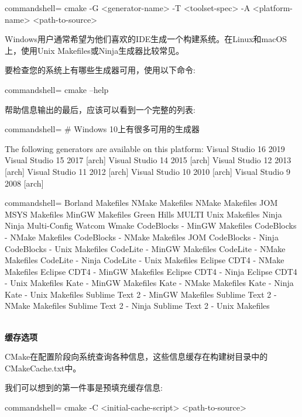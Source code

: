 \begin{tcblisting}{commandshell={}}
cmake -G <generator-name>
      -T <toolset-spec> -A <platform-name>
      <path-to-source>
\end{tcblisting}

Windows用户通常希望为他们喜欢的IDE生成一个构建系统。在Linux和macOS上，使用Unix Makefiles或Ninja生成器比较常见。

要检查您的系统上有哪些生成器可用，使用以下命令:

\begin{tcblisting}{commandshell={}}
cmake --help
\end{tcblisting}

帮助信息输出的最后，应该可以看到一个完整的列表:

\begin{tcblisting}{commandshell={}}
# Windows 10上有很多可用的生成器

The following generators are available on this platform:
Visual Studio 16 2019
Visual Studio 15 2017 [arch]
Visual Studio 14 2015 [arch]
Visual Studio 12 2013 [arch]
Visual Studio 11 2012 [arch]
Visual Studio 10 2010 [arch]
Visual Studio 9 2008 [arch]
\end{tcblisting}
\begin{tcblisting}{commandshell={}}
Borland Makefiles
NMake Makefiles
NMake Makefiles JOM
MSYS Makefiles
MinGW Makefiles
Green Hills MULTI
Unix Makefiles
Ninja
Ninja Multi-Config
Watcom Wmake
CodeBlocks - MinGW Makefiles
CodeBlocks - NMake Makefiles
CodeBlocks - NMake Makefiles JOM
CodeBlocks - Ninja
CodeBlocks - Unix Makefiles
CodeLite - MinGW Makefiles
CodeLite - NMake Makefiles
CodeLite - Ninja
CodeLite - Unix Makefiles
Eclipse CDT4 - NMake Makefiles
Eclipse CDT4 - MinGW Makefiles
Eclipse CDT4 - Ninja
Eclipse CDT4 - Unix Makefiles
Kate - MinGW Makefiles
Kate - NMake Makefiles
Kate - Ninja
Kate - Unix Makefiles
Sublime Text 2 - MinGW Makefiles
Sublime Text 2 - NMake Makefiles
Sublime Text 2 - Ninja
Sublime Text 2 - Unix Makefiles
\end{tcblisting}

\hspace*{\fill} \\ %
\noindent
\textbf{缓存选项}

CMake在配置阶段向系统查询各种信息，这些信息缓存在构建树目录中的CMakeCache.txt中。

我们可以想到的第一件事是预填充缓存信息:

\begin{tcblisting}{commandshell={}}
cmake -C <initial-cache-script> <path-to-source>
\end{tcblisting}

